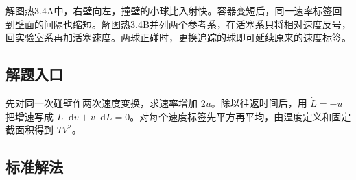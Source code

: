 \documentclass[UTF8,fontset=fandol,a4paper,11pt]{ctexart}
\newcommand{\dd}{\mathop{}\!\mathrm{d}}
\begin{document}
解图热3.4A中，右壁向左，撞壁的小球比入射快。容器变短后，同一速率标签回到壁面的间隔也缩短。解图热3.4B并列两个参考系，在活塞系只将相对速度反号，回实验室系再加活塞速度。两球正碰时，更换追踪的球即可延续原来的速度标签。



\subsection*{解题入口}

先对同一次碰壁作两次速度变换，求速率增加 $2u$。除以往返时间后，用 $\dot L=-u$ 把增速写成 $L\dd v+v\dd L=0$。对每个速度标签先平方再平均，由温度定义和固定截面积得到 $TV^2$。




\subsection*{标准解法}
\end{document}
